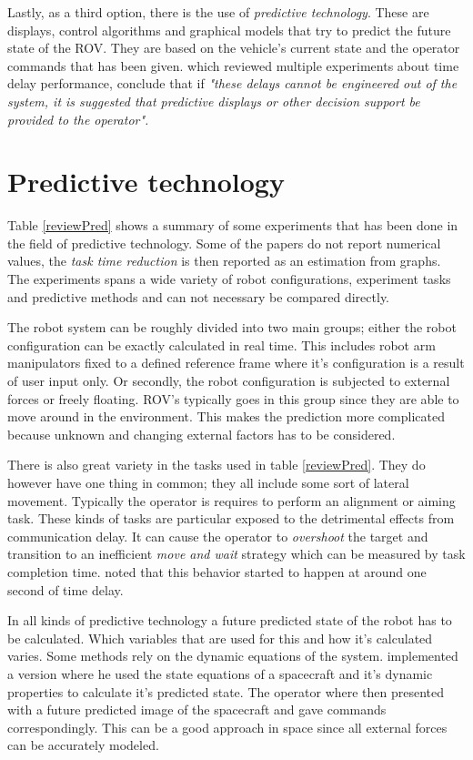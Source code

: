 Lastly, as a third option, there is the use of \emph{predictive technology}. These are displays, control algorithms and graphical models that try to predict the future state of the ROV. They are based on the vehicle's current state and the operator commands that has been given. \citep{Chen2007} which reviewed multiple experiments about time delay performance, conclude that if \emph{"these delays cannot be engineered out of the system, it is suggested that predictive displays or other decision support be provided to the operator".}


\section{Predictive technology}



Table \ref{reviewPred} shows a summary of some experiments that has been done in the field of predictive technology. Some of the papers do not report numerical values, the \emph{task time reduction} is then reported as an estimation from graphs. The experiments spans a wide variety of robot configurations, experiment tasks and predictive methods and can not necessary be compared directly.


The robot system can be roughly divided into two main groups; either the robot configuration can be exactly calculated in real time. This includes robot arm manipulators fixed to a defined reference frame where it's configuration is a result of user input only. Or secondly, the robot configuration is subjected to external forces or freely floating. ROV's typically goes in this group since they are able to move around in the environment. This makes the prediction more complicated because unknown and changing external factors has to be considered.

There is also great variety in the tasks used in table \ref{reviewPred}. They do however have one thing in common; they all include some sort of lateral movement. Typically the operator is requires to perform an alignment or aiming task. These kinds of tasks are particular exposed to the detrimental effects from communication delay. It can cause the operator to \emph{overshoot} the target and transition to an inefficient \emph{move and wait} strategy which can be measured by task completion time. \citep{Lane2002} noted that this behavior started to happen at around one second of time delay.

In all kinds of predictive technology a future predicted state of the robot has to be calculated. Which variables that are used for this and how it's calculated varies. Some methods rely on the dynamic equations of the system. \citep{Zhang2017} implemented a version where he used the state equations of a spacecraft and it's dynamic properties to calculate it's predicted state. The operator where then presented with a future predicted image of the spacecraft and gave commands correspondingly. This can be a good approach in space since all external forces can be accurately modeled.

